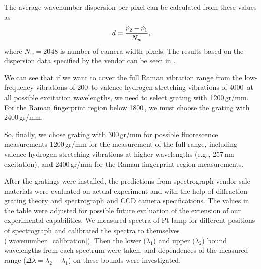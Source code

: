 The average wavenumber dispersion per pixel can be calculated from these
values as
\begin{equation}
	\bar{d} = \frac{\tilde{\nu}_2 - \tilde{\nu}_1}{N_w},
	\label{\eqnlabel{spectrograph_selection:dispersion_est}}
\end{equation}
where $N_w = 2048$ is number of camera width pixels.
The results based on the dispersion data specified by the vendor can be seen in
.

\begin{table}
	\centering
	
	\caption[%
		Estimated Raman-shift ranges that can be captured by CCD detector
		for particular available excitation wavelengths.%
	]{%
		Gratings are denoted by the number of grooves per mm, $\tilde{\nu}_1$ and
		$\tilde{\nu}_2$ are the lowest and highest detected frequencies in \icm{}
		calculated according to
		\cref{%
			\eqnlabel{spectrograph_selection:spectral_range_max_est},%
			\eqnlabel{spectrograph_selection:spectral_range_min_est}%
		},
		respectively. The $\bar{d}$ denotes average dispersion in \icm/px
		calculated from
		.
	}
	\label{\tablabel{spectrograph_selection:dispersion_est}}
\end{table}

We can see that if we want to cover the full Raman vibration range from the
low-frequency vibrations of 200\,\icm{} to valence hydrogen stretching
vibrations of 4000\,\icm{} at all possible excitation wavelengths, we need to
select grating with 1200\,gr/mm.
For the Raman fingerprint region below 1800\,\icm{}, we must choose the
grating with 2400\,gr/mm.

So, finally, we chose grating with 300\,gr/mm for possible fluorescence
measurements 1200\,gr/mm for the measurement of the full range, including
valence hydrogen stretching vibrations at higher wavelengths (e.g., 257\,nm
excitation), and 2400\,gr/mm for the Raman fingerprint region measurements.

After the gratings were installed, the predictions from spectrograph vendor
sale materials were evaluated on actual experiment and with the help of
diffraction grating theory and spectrograph and CCD camera specifications.
The values in the table were adjusted for possible future evaluation of the
extension of our experimental capabilities.
We measured spectra of Pt lamp for different positions of spectrograph and
calibrated the spectra to themselves
(\cref{wavenumber_calibration}).
Then the lower ($\lambda_1$) and upper ($\lambda_2$) bound wavelengths from
each spectrum were taken, and dependences of the measured range
($\Delta\lambda = \lambda_2 - \lambda_1$)
on these bounds were investigated.

